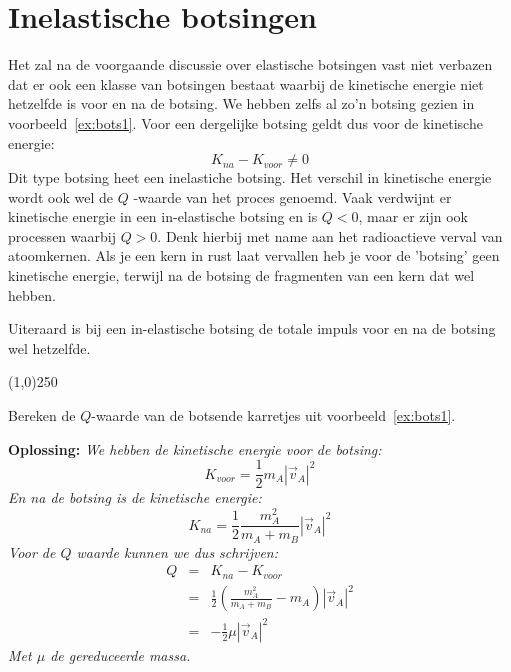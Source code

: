 \section{Inelastische botsingen}

Het zal na de voorgaande discussie over elastische botsingen vast niet verbazen dat er ook
een klasse van botsingen bestaat waarbij de kinetische energie niet hetzelfde is voor en na 
de botsing. We hebben zelfs al zo'n  botsing gezien in voorbeeld~\ref{ex:bots1}. 
Voor een dergelijke botsing geldt dus voor de kinetische energie:
\begin{equation}
K_{na} - K_{voor} \neq 0
\end{equation}
Dit type botsing heet een inelastiche botsing. Het verschil in kinetische energie wordt ook
wel de $Q$ -waarde van het proces genoemd. Vaak verdwijnt er kinetische energie in een
in-elastische botsing en is $Q<0$, maar er zijn ook processen waarbij $Q>0$. Denk hierbij met name
aan het radioactieve verval van atoomkernen. Als je een kern in rust laat vervallen heb je
voor de 'botsing' geen kinetische energie, terwijl na de botsing de fragmenten van een kern dat wel
hebben.

Uiteraard is bij een in-elastische botsing de totale impuls voor en na de botsing wel hetzelfde.

\begin{center}
\line(1,0){250}
\end{center}
\begin{voorbeeld} \label{ex:bots5}
Bereken de $Q$-waarde van de botsende karretjes uit voorbeeld~\ref{ex:bots1}.

{\bf Oplossing: }{\it We hebben de kinetische energie voor de botsing:
\begin{equation}
K_{voor} = \frac{1}{2}m_A|\vec{v}_A|^2
\end{equation}
En na de botsing is de kinetische energie:
\begin{equation}
K_{na} = \frac{1}{2}\frac{m_A^2}{m_A+m_B}|\vec{v}_A|^2
\end{equation}
Voor de $Q$ waarde kunnen we dus schrijven:
\begin{eqnarray}
Q & = & K_{na}-K_{voor} \\
& = & \frac{1}{2}\left(\frac{m_A^2}{m_A+m_B} - m_A\right)|\vec{v}_A|^2\\
& = & -\frac{1}{2}\mu|\vec{v}_A|^2
\end{eqnarray}
Met $\mu$ de gereduceerde massa.
}
\end{voorbeeld}

